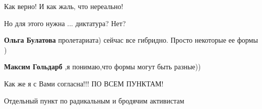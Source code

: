 \begin{itemize}
\begin{itemize}
\end{itemize}

 
Как верно! И как жаль, что нереально!

 
Но для этого нужна ... диктатура? Нет?

\begin{itemize}
 
\textbf{Ольга Булатова} пролетариата)
сейчас все гибридно. Просто некоторые ее формы )

 
\textbf{Максим Гольдарб} ,я понимаю,что формы могут быть разные))
\end{itemize}

 
Как же я с Вами согласна!!! ПО ВСЕМ ПУНКТАМ!

 
Отдельный пункт по радикальным и бродячим активистам

 

\end{itemize}
